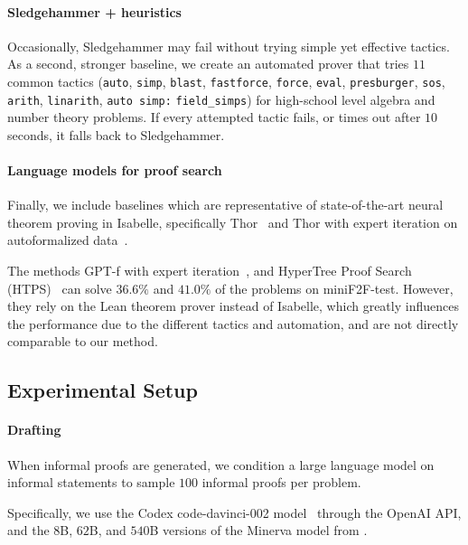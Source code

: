 \paragraph{Sledgehammer + heuristics} Occasionally, Sledgehammer may fail without trying simple yet effective tactics. As a second, stronger baseline, we create an automated prover that tries $11$ common tactics (\texttt{auto}, \texttt{simp}, \texttt{blast}, \texttt{fastforce}, \texttt{force}, \texttt{eval}, \texttt{presburger}, \texttt{sos}, \texttt{arith}, \texttt{linarith}, \texttt{auto simp:}  \texttt{field\_simps}) for high-school level algebra and number theory problems. If every attempted tactic fails, or times out after $10$ seconds, it falls back to Sledgehammer.

\paragraph{Language models for proof search} Finally, we include baselines which are representative of state-of-the-art neural theorem proving in Isabelle, specifically Thor~\citep{jiang2022thor} and Thor with expert iteration on autoformalized data~\citep{wu2022autoformalization}.

The methods GPT-f with expert iteration~\citep{polu2022formal}, and HyperTree Proof Search (HTPS)~\citep{lample2022hypertree} can solve $36.6\%$ and $41.0\%$ of the problems on miniF2F-test. However, they rely on the Lean theorem prover instead of Isabelle, which greatly influences the performance due to the different tactics and automation, and are not directly comparable to our method.

\subsection{Experimental Setup}
\label{sec:exp setup}

\paragraph{Drafting}

 When informal proofs are generated, we condition a large language model on informal statements to sample $100$ informal proofs per problem.

Specifically, we use the Codex code-davinci-002 model~\citep{chen2021EvaluatingLL} through the OpenAI API, and the $8$B, $62$B, and $540$B versions of the Minerva model from \citet{lewkowycz2022solving}.

